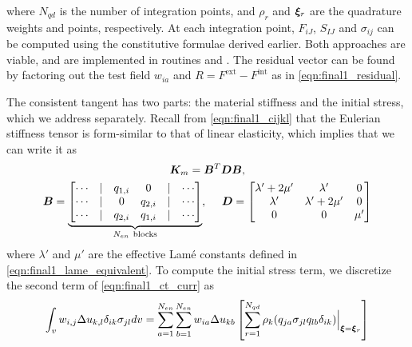 where $N_{qd}$ is the number of integration points, and $\rho_r$ and $\bm{\xi}_r$ are the quadrature weights and points, respectively.
At each integration point, $F_{iJ}$, $S_{IJ}$ and $\sigma_{ij}$ can be computed using the constitutive formulae derived earlier. 
Both approaches are viable, and are implemented in routines \href{https://github.com/sy-cui/CSE552-FA2024/blob/main/final/part1/elasticity/hyperelasticity/fint_2d.m}{} and \href{https://github.com/sy-cui/CSE552-FA2024/blob/main/final/part1/elasticity/hyperelasticity/fint_elem_2d.m}{}.
The residual vector can be found by factoring out the test field $w_{ia}$ and $R = F^{\textrm{ext}} - F^{\textrm{int}}$ as in \cref{eqn:final1_residual}.

The consistent tangent has two parts: the material stiffness and the initial stress, which we address separately. 
Recall from \cref{eqn:final1_cijkl} that the Eulerian stiffness tensor is form-similar to that of linear elasticity, which implies that we can write it as 
\begin{equation}\label{eqn:final1_ct_m_discrete}
\begin{gathered}
    \bm{K}_m = \bm{B}^T \bm{D} \bm{B}, \\
    \bm{B} = \underbrace{\begin{bmatrix} 
        \cdots & | & q_{1,i} & 0 & | & \cdots \\
        \cdots & | & 0 & q_{2,i} & | & \cdots \\
        \cdots & | & q_{2,i} & q_{1,i} & | & \cdots
    \end{bmatrix}}_{N_{en}~\textrm{blocks}}, ~~~~
    \bm{D} = \begin{bmatrix}
        \lambda' + 2\mu' & \lambda' & 0 \\
        \lambda' & \lambda' + 2\mu' & 0 \\
        0 & 0 & \mu'
    \end{bmatrix}
\end{gathered}
\end{equation}
where $\lambda'$ and $\mu'$ are the effective Lam\'{e} constants defined in \cref{eqn:final1_lame_equivalent}.
To compute the initial stress term, we discretize the second term of \cref{eqn:final1_ct_curr} as 
\begin{equation}
\begin{aligned}
    \int_v w_{i,j} \Delta u_{k,l} \delta_{ik} \sigma_{jl} dv &= \sum_{a=1}^{N_{en}} \sum_{b=1}^{N_{en}} w_{ia} \Delta u_{kb} \left[ \sum_{r=1}^{N_{qd}} \rho_k (q_{ja} \sigma_{jl} q_{lb} \delta_{ik}) \Big|_{\bm{\xi} = \bm{\xi}_r} \right]\\
\end{aligned}
\end{equation}
